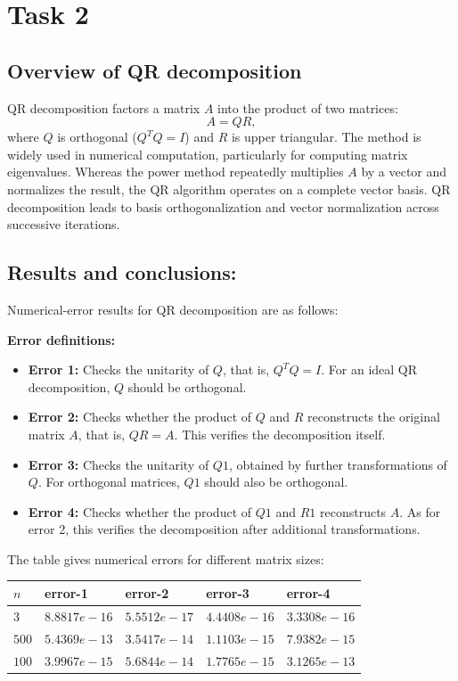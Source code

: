 \section{Task 2}

\subsection{Overview of QR decomposition}

QR decomposition factors a matrix \( A \) into the product of two matrices:
\[
A = QR,
\]  
where \( Q \) is orthogonal (\( Q^T Q = I \)) and \( R \) is upper triangular. The method is widely used in numerical computation, particularly for computing matrix eigenvalues.
Whereas the power method repeatedly multiplies \( A \) by a vector and normalizes the result, the QR algorithm operates on a complete vector basis. QR decomposition leads to basis orthogonalization and vector normalization across successive iterations.

\subsection{Results and conclusions:}

Numerical-error results for QR decomposition are as follows:

\textbf{Error definitions:}
\begin{itemize}
\item \textbf{Error 1:} Checks the unitarity of \( Q \), that is, \( Q^T Q = I \). For an ideal QR decomposition, \( Q \) should be orthogonal.
\item \textbf{Error 2:} Checks whether the product of \( Q \) and \( R \) reconstructs the original matrix \( A \), that is, \( Q R = A \). This verifies the decomposition itself.
\item \textbf{Error 3:} Checks the unitarity of \( Q1 \), obtained by further transformations of \( Q \). For orthogonal matrices, \( Q1 \) should also be orthogonal.
\item \textbf{Error 4:} Checks whether the product of \( Q1 \) and \( R1 \) reconstructs \( A \). As for error 2, this verifies the decomposition after additional transformations.
\end{itemize}
The table gives numerical errors for different matrix sizes:

\begin{center}
\begin{tabular}{|l|l|l|l|l|}
\hline 
$n$   & error-1       & error-2       & error-3       & error-4       \\ \hline
$3$   & $8.8817e-16$ & $5.5512e-17$ & $4.4408e-16$ & $3.3308e-16$ \\ \hline
$500$ & $5.4369e-13$ & $3.5417e-14$ & $1.1103e-15$ & $7.9382e-15$ \\ \hline
$100$ & $3.9967e-15$ & $5.6844e-14$ & $1.7765e-15$ & $3.1265e-13$ \\ \hline
\end{tabular}
\end{center}

